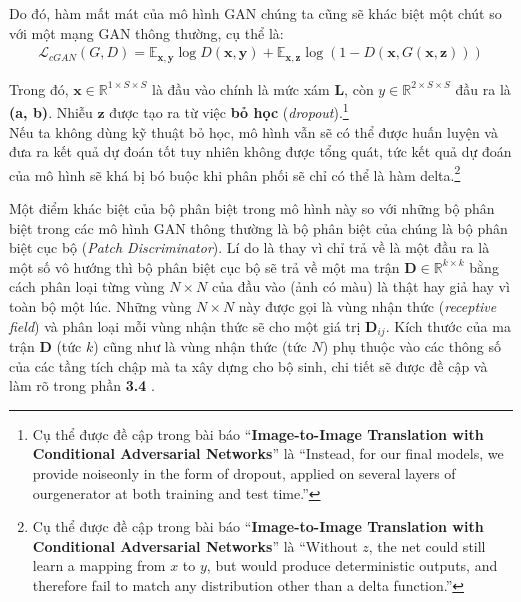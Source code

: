 \documentclass[a4paper]{article}
\begin{document}
\noindent
Do đó, hàm mất mát của mô hình GAN chúng ta cũng sẽ khác biệt một chút so với một mạng GAN thông thường, cụ thể là:
\begin{align*}
    \mathcal{L}_{cGAN}(G, D) = \mathbb{E}_{\mathbf{x}, \mathbf{y}}\log D\left(\mathbf{x}, \mathbf{y}\right) + \mathbb{E}_{\mathbf{x}, \mathbf{z}}\log \left(1 - D\left(\mathbf{x}, G\left(\mathbf{x}, \mathbf{z}\right)\right)\right)
\end{align*}

\noindent
Trong đó, $\mathbf{x} \in \mathbb{R}^{1\times S \times S}$ là đầu vào chính là mức xám \textbf{L}, còn $y \in \mathbb{R}^{2\times S \times S}$ đầu ra là \textbf{(a, b)}. Nhiễu $\mathbf{z}$ được tạo ra từ việc \textbf{bỏ học} (\textit{dropout}).\footnote{Cụ thể được đề cập trong bài báo ``\textbf{Image-to-Image Translation with Conditional Adversarial Networks}'' là ``Instead, for our final models, we provide noiseonly in the form of dropout, applied on several layers of ourgenerator at both training and test time.''}\\
Nếu ta không dùng kỹ thuật bỏ học, mô hình vẫn sẽ có thể được huấn luyện và đưa ra kết quả dự đoán tốt tuy nhiên không được tổng quát, tức kết quả dự đoán của mô hình sẽ khá bị bó buộc khi phân phối sẽ chỉ có thể là hàm delta.\footnote{Cụ thể được đề cập trong bài báo ``\textbf{Image-to-Image Translation with Conditional Adversarial Networks}'' là ``Without $z$, the net could still learn a mapping from $x$ to $y$, but would produce deterministic outputs, and therefore fail to match any distribution other than a delta function.''}

\noindent
Một điểm khác biệt của bộ phân biệt trong mô hình này so với những bộ phân biệt trong các mô hình GAN thông thường là bộ phân biệt của chúng là bộ phân biệt cục bộ (\textit{Patch Discriminator}). Lí do là thay vì chỉ trả về là một đầu ra là một số vô hướng thì bộ phân biệt cục bộ sẽ trả về một ma trận $\mathbf{D} \in \mathbb{R}^{k\times k}$ bằng cách phân loại từng vùng $N \times N$ của đầu vào (ảnh có màu) là thật hay giả hay vì toàn bộ một lúc. Những vùng $N \times N$ này được gọi là vùng nhận thức (\textit{receptive field}) và phân loại mỗi vùng nhận thức sẽ cho một giá trị $\mathbf{D}_{ij}$. Kích thước của ma trận $\mathbf{D}$ (tức $k$) cũng như là vùng nhận thức (tức $N$) phụ thuộc vào các thông số của các tầng tích chập mà ta xây dựng cho bộ sinh, chi tiết sẽ được đề cập và làm rõ trong phần \textbf{3.4 }.\\
\end{document}
